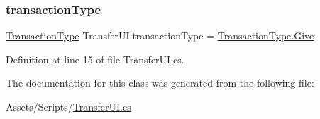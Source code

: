 \subsubsection{\texorpdfstring{transactionType}{transactionType}}
{\footnotesize\ttfamily \mbox{\hyperlink{class_transfer_u_i_acb894008318cb07b7144beb2d6d81606}{Transaction\+Type}} Transfer\+U\+I.\+transaction\+Type = \mbox{\hyperlink{class_transfer_u_i_acb894008318cb07b7144beb2d6d81606a2f355d9fa7accc561d3edc335de2fbcf}{Transaction\+Type.\+Give}}}



Definition at line 15 of file Transfer\+U\+I.\+cs.



The documentation for this class was generated from the following file\+:\begin{DoxyCompactItemize}
\item 
Assets/\+Scripts/\mbox{\hyperlink{_transfer_u_i_8cs}{Transfer\+U\+I.\+cs}}\end{DoxyCompactItemize}
